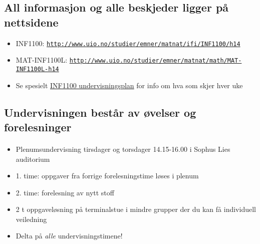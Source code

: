 \documentclass[%
oneside,                 %
final,                   %
10pt]{article}
\begin{document}
\noindent



\subsection*{All informasjon og alle beskjeder ligger på nettsidene}

\begin{itemize}
 \item INF1100:
   \href{{http://www.uio.no/studier/emner/matnat/ifi/INF1100/h14}}{\nolinkurl{http://www.uio.no/studier/emner/matnat/ifi/INF1100/h14}}

 \item MAT-INF1100L:
   \href{{http://www.uio.no/studier/emner/matnat/math/MAT-INF1100L-h14}}{\nolinkurl{http://www.uio.no/studier/emner/matnat/math/MAT-INF1100L-h14}}

 \item Se spesielt \href{{https://www.uio.no/studier/emner/matnat/ifi/INF1100/h14/ressurser/undervisningsplan.html}}{INF1100 undervisningsplan} for info om hva som skjer hver uke
\end{itemize}

\noindent
\subsection*{Undervisningen består av øvelser og forelesninger}


\paragraph{}
\begin{itemize}
  \item Plenumsundervisning tirsdager og torsdager 14.15-16.00 i Sophus Lies auditorium

  \item 1. time: oppgaver fra forrige forelesningstime løses i plenum

  \item 2. time: forelesning av nytt stoff

  \item 2 t oppgaveløsning på terminalstue i mindre grupper der du kan få individuell veiledning

  \item Delta på \emph{alle} undervisningstimene!
\end{itemize}
\end{document}

